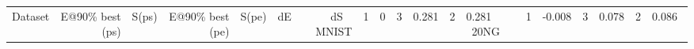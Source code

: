 \begin{tabular}{l r r r r r r}
Dataset & E@90\% best (ps) & S(ps) & E@90\% best (pe) & S(pe) & dE & dS \
\hline
MNIST & 1 & 0 & 3 & 0.281 & 2 & 0.281 \
20NG & 1 & -0.008 & 3 & 0.078 & 2 & 0.086 \
\end{tabular}
